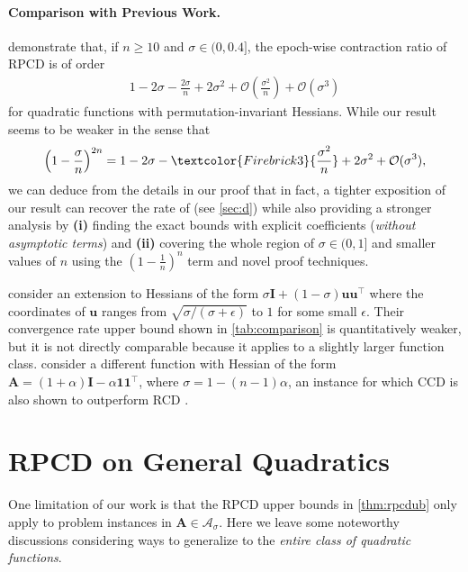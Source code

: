 \documentclass{article}
\theoremstyle{plain}
\theoremstyle{definition}
\theoremstyle{remark}
\def\bigopen#1{\left(#1\right)}
\def\bigset#1{\left\{#1\right\}}
\newcommand{\red}[1]{\textcolor{Firebrick3}{#1}}%
\renewcommand{\sp}{\mathrm{span}}
\def\vone{{\bm{1}}}
\def\vu{{\bm{u}}}
\def\mA{{\bm{A}}}
\def\mI{{\bm{I}}}
\def\gA{{\mathcal{A}}}
\def\gM{{\mathcal{M}}}
\def\gO{{\mathcal{O}}}
\begin{document}
\paragraph{Comparison with Previous Work.}
\citet{lee2019} demonstrate that, if $n\ge 10$ and $\sigma \in (0, 0.4]$, the epoch-wise contraction ratio of RPCD is of order
\begin{align*}
    1 - 2 \sigma - \frac{2 \sigma}{n} + 2 \sigma^2 + \gO \bigopen{\frac{\sigma^2}{n}} + \gO \bigopen{\sigma^3}
\end{align*}
for quadratic functions with permutation-invariant Hessians.
While our result seems to be weaker in the sense that
\begin{align*}
    \bigopen{1 - \frac{\sigma}{n}}^{2n} = 1 - 2 \sigma - \red{\frac{\sigma^2}{n}} + 2 \sigma^2 + \gO(\sigma^3),
\end{align*}
we can deduce from the details in our proof that in fact, a tighter exposition of our result can recover the rate of \citet{lee2019} (see \cref{sec:d}) while also providing a stronger analysis by \textbf{(i)} finding the exact bounds with explicit coefficients (\emph{without asymptotic terms}) and \textbf{(ii)} covering the whole region of $\sigma \in (0, 1]$ and smaller values of $n$ using the $(1-\frac{1}{n})^n$ term and novel proof techniques.

\citet{wright17} consider an extension to Hessians of the form $\sigma \mI + (1 - \sigma) \vu \vu^{\top}$ where the coordinates of $\vu$ ranges from $\sqrt{\sigma/(\sigma + \epsilon)}$ to $1$ for some small $\epsilon$.
Their convergence rate upper bound shown in \cref{tab:comparison} is quantitatively weaker, but it is not directly comparable because it applies to a slightly larger function class.
\citet{gurbuzbalaban18} consider a different function with Hessian of the form $\mA = (1 + \alpha) \mI - \alpha \vone \vone^{\top}$, where $\sigma = 1 - (n-1) \alpha$, an instance for which CCD is also shown to outperform RCD \citep{gurbuzbalaban17}.

\section{RPCD on General Quadratics}
\label{sec:4}


One limitation of our work is that the RPCD upper bounds in \cref{thm:rpcdub} only apply to problem instances in $\mA \in \gA_{\sigma}$.
Here we leave some noteworthy discussions considering ways to generalize to the \emph{entire class of quadratic functions}.
\end{document}
